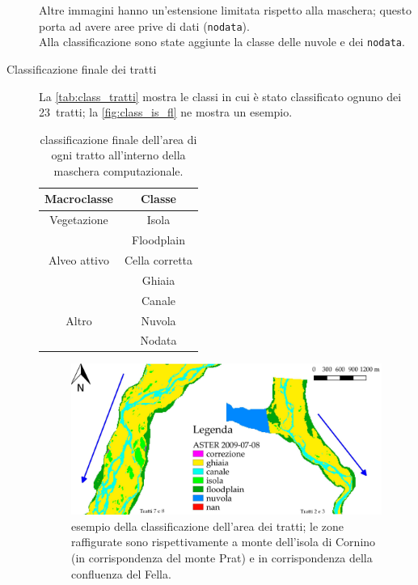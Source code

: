 \begin{description}
	Altre immagini hanno un'estensione limitata rispetto alla maschera; questo porta ad avere aree prive di dati (\texttt{nodata}).
	\\
	Alla classificazione sono state aggiunte la classe delle nuvole e dei \texttt{nodata}.
	\item[Classificazione finale dei tratti] La \vref{tab:class_tratti} mostra le classi in cui è stato classificato ognuno dei 23~tratti; la \vref{fig:class_is_fl} ne mostra un esempio.
	\begin{table}[ht]
		\centering
		\begin{tabular}{
			c 
			c
			}
			\toprule
			\textbf{Macroclasse}	&	\textbf{Classe}	\\
			\midrule
			Vegetazione		&	Isola	\\
							&	Floodplain	\\
			Alveo attivo	&	Cella corretta	\\
							&	Ghiaia	\\
							&	Canale	\\
			Altro			&	Nuvola	\\
							&	Nodata	\\
			\bottomrule
		\end{tabular}
		\caption[classificazione dell'area dei tratti]{classificazione finale dell'area di ogni tratto all'interno della maschera computazionale.}
		\label{tab:class_tratti}
	\end{table}
	\begin{figure}[ht]
		\centering
		\includegraphics[width=\textwidth]{files/esempio_class_is_fl.jpeg}
		\caption[esempio della classificazione dell'area dei tratti]{esempio della classificazione dell'area dei tratti; le zone raffigurate sono rispettivamente a monte dell'isola di Cornino (in corrispondenza del monte Prat) e in corrispondenza della confluenza del Fella.}
		\label{fig:class_is_fl}
	\end{figure}

\end{description}
